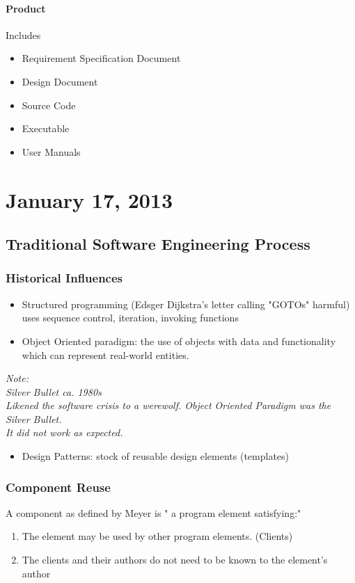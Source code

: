 \documentclass{report}
\begin{document}
		\subsubsection{Product}
			Includes
			\begin{itemize}
				\item Requirement Specification Document
				\item Design Document
				\item Source Code
				\item Executable
				\item User Manuals
			\end{itemize}
\chapter{January 17, 2013}
	\section{Traditional Software Engineering Process}
		\subsection{Historical Influences}
			\begin{itemize}
				\item Structured programming (Edsger Dijkstra's letter calling "GOTOs" harmful) uses sequence control, iteration, invoking functions
				\item Object Oriented paradigm: the use of objects with data and functionality which can represent real-world entities.
			\end{itemize}
			\textit{Note:\\Silver Bullet ca. 1980s\\ Likened the software crisis to a werewolf.  Object Oriented Paradigm was the Silver Bullet.\\It did not work as expected.}
			\begin{itemize}
				\item Design Patterns: stock of reusable design elements (templates)
			\end{itemize}
		\subsection{Component Reuse}
			A component as defined by Meyer is " a program element satisfying:"
			\begin{enumerate}
				\item The element may be used by other program elements. (Clients)
				\item The clients and their authors do not need to be known to the element's author
			\end{enumerate}
\end{document}
